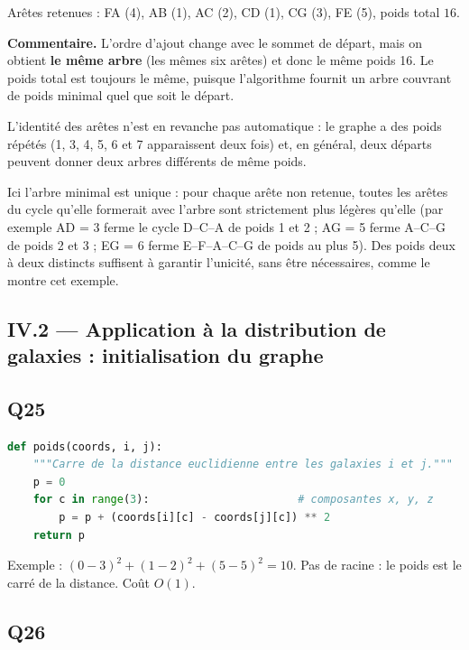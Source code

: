 \documentclass[11pt,a4paper]{article}
\newcommand{\equationajustee}[1]{%
  \sbox{\boiteequation}{$\displaystyle #1$}%
  \ifdim\wd\boiteequation>\linewidth
    \[\resizebox{\linewidth}{!}{\usebox{\boiteequation}}\]%
  \else
    \[#1\]%
  \fi}
\begin{document}
\equationajustee{\boxed{\text{Ordre d'ajout : F, A, B, C, D, G, E}}}

Arêtes retenues : FA (4), AB (1), AC (2), CD (1), CG (3), FE (5), poids total \(16\).

\textbf{Commentaire.} L'ordre d'ajout change avec le sommet de départ, mais on obtient \textbf{le même arbre} (les mêmes six arêtes) et donc le même poids 16. Le poids total est toujours le même, puisque l'algorithme fournit un arbre couvrant de poids minimal quel que soit le départ.

L'identité des arêtes n'est en revanche pas automatique : le graphe a des poids répétés (1, 3, 4, 5, 6 et 7 apparaissent deux fois) et, en général, deux départs peuvent donner deux arbres différents de même poids.

Ici l'arbre minimal est unique : pour chaque arête non retenue, toutes les arêtes du cycle qu'elle formerait avec l'arbre sont strictement plus légères qu'elle (par exemple AD = 3 ferme le cycle D--C--A de poids 1 et 2 ; AG = 5 ferme A--C--G de poids 2 et 3 ; EG = 6 ferme E--F--A--C--G de poids au plus 5). Des poids deux à deux distincts suffisent à garantir l'unicité, sans être nécessaires, comme le montre cet exemple.

\hypertarget{iv.2-application-uxe0-la-distribution-de-galaxies-initialisation-du-graphe}{%
\subsection{IV.2 --- Application à la distribution de galaxies : initialisation du graphe}\label{iv.2-application-uxe0-la-distribution-de-galaxies-initialisation-du-graphe}}

\hypertarget{q25}{%
\subsection{Q25}\label{q25}}

\begin{lstlisting}[language=Python]
def poids(coords, i, j):
    """Carre de la distance euclidienne entre les galaxies i et j."""
    p = 0
    for c in range(3):                       # composantes x, y, z
        p = p + (coords[i][c] - coords[j][c]) ** 2
    return p
\end{lstlisting}

Exemple : \((0-3)^2 + (1-2)^2 + (5-5)^2 = 10\). Pas de racine : le poids est le carré de la distance. Coût \(O(1)\).

\hypertarget{q26}{%
\subsection{Q26}\label{q26}}
\end{document}
